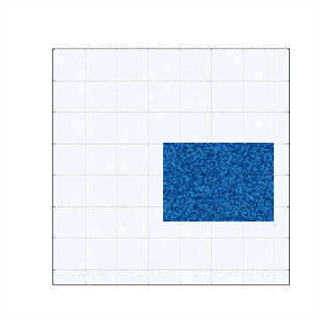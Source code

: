 \documentclass[
    12pt,                %
    oneside,            %
    a4paper,            %
    english,            %
    brazil                %
    ]{abntex2ppgsi}
\begin{document}
\begin{figure} [htpb]
\centering
 \caption{
        Dados sintéticos gerados a partir das diferentes estruturas de cogrupos.
        (a) Um único cogrupo.
        (b) Cogrupos com linhas e colunas sem intersecção.
        (c) Cogrupos com estrutura em xadrez.  %
        (d) Cogrupos sem intersecção nas linhas e com intersecção nas colunas.
        (e) Cogrupos com intersecção nas linhas e sem intersecção nas colunas.
    }
    \begin{subfigure}[b]{0.18\textwidth}
        \includegraphics[width=\textwidth]{img/a-bic-structure.png}
        \caption{}
        \label{fig:bic-syntetic-structure:a}
    \end{subfigure}
    ~ %
    \begin{subfigure}[b]{0.18\textwidth}

\end{subfigure}
\end{figure}
\end{document}
